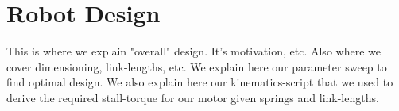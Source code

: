 \section{Robot Design}
\label{sec:robot_design}

This is where we explain "overall" design. It's motivation, etc. 
Also where we cover dimensioning, link-lengths, etc. 
We explain here our parameter sweep to find optimal design. 
We also explain here our kinematics-script that we used to derive the required stall-torque for our motor given springs and link-lengths. 

\subsection{}

\subsection{}